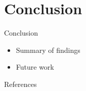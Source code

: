 \documentclass[aspectratio=54,xcolor=dvipsnames]{beamer}
\begin{document}
\section{Conclusion}
\begin{frame}{Conclusion}
    \begin{itemize}
        \item Summary of findings
        \item Future work
    \end{itemize}
\end{frame}

\begin{frame}{References}
\end{frame}
\end{document}
